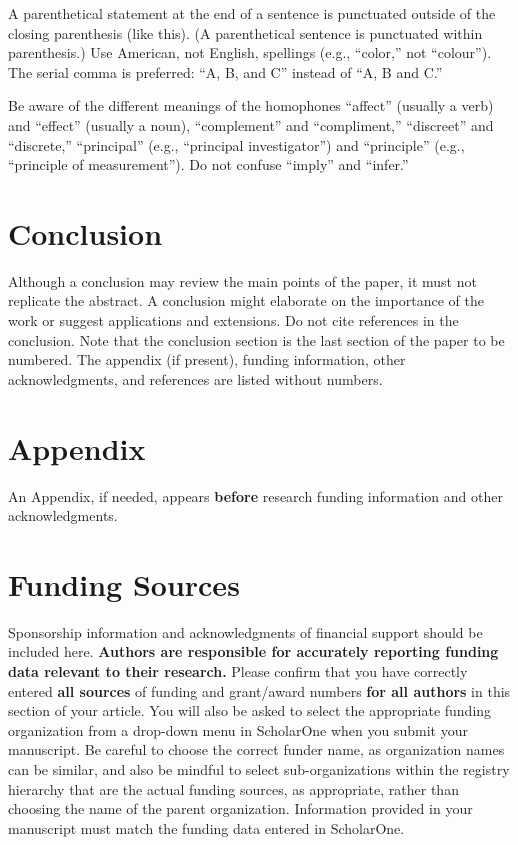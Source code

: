 \documentclass[journal ]{new-aiaa}
\begin{document}
A parenthetical statement at the end of a sentence is punctuated outside of the closing parenthesis (like this). (A parenthetical sentence is punctuated within parenthesis.) Use American, not English, spellings (e.g., “color,” not “colour”). The serial comma is preferred: “A, B, and C” instead of “A, B and C.”

Be aware of the different meanings of the homophones “affect” (usually a verb) and “effect” (usually a noun), “complement” and “compliment,” “discreet” and “discrete,” “principal” (e.g., “principal investigator”) and “principle” (e.g., “principle of measurement”). Do not confuse “imply” and “infer.”

\section{Conclusion}
Although a conclusion may review the main points of the paper, it must not replicate the abstract. A conclusion might elaborate on the importance of the work or suggest applications and extensions. Do not cite references in the conclusion. Note that the conclusion section is the last section of the paper to be numbered. The appendix (if present), funding information, other acknowledgments, and references are listed without numbers.

\section*{Appendix}

An Appendix, if needed, appears \textbf{before} research funding information and other acknowledgments.

\section*{Funding Sources}

Sponsorship information and acknowledgments of financial support should be included here. \textbf{Authors are responsible for accurately reporting funding data relevant to their research.} Please confirm that you have correctly entered \textbf{all sources} of funding and grant/award numbers \textbf{for all authors} in this section of your article. You will also be asked to select the appropriate funding organization from a drop-down menu in ScholarOne when you submit your manuscript. Be careful to choose the correct funder name, as organization names can be similar, and also be mindful to select sub-organizations within the registry hierarchy that are the actual funding sources, as appropriate, rather than choosing the name of the parent organization. Information provided in your manuscript must match the funding data entered in ScholarOne.
\end{document}
